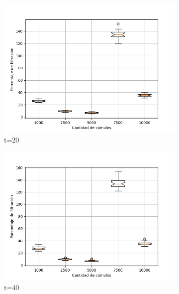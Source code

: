 \documentclass{article}
\begin{document}
\begin{figure}
       \centering
       \begin{subfigure}[b]{0.49\linewidth}
           \includegraphics[width=\linewidth]{tareaocho20.png}
           \caption{t=20}
           \label{fig:westminster_lateral}
        \end{subfigure}
        \begin{subfigure}[b]{0.49\linewidth}
            \includegraphics[width=\linewidth]{tareaocho40.png}
            \caption{t=40}
            \label{fig:westminster_aerea}
        \end{subfigure}
        \begin{subfigure}[b]{0.49\linewidth}

\end{subfigure}
\end{figure}
\end{document}
